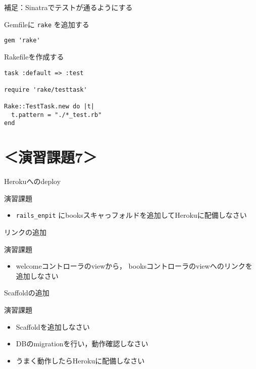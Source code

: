 \documentclass[t, aspectratio=169]{beamer}
\begin{document}
\begin{frame}[fragile,label=sec-7-3-9]{補足：Sinatraでテストが通るようにする}
 \begin{block}{Gemfileに \texttt{rake} を追加する}
\begin{verbatim}
gem 'rake'
\end{verbatim}
\end{block}
\begin{block}{Rakefileを作成する}
\begin{verbatim}
task :default => :test

require 'rake/testtask'

Rake::TestTask.new do |t|
  t.pattern = "./*_test.rb"
end
\end{verbatim}
\end{block}
\end{frame}
\section{＜演習課題7＞}
\label{sec-7-4}
\begin{frame}[fragile,label=sec-7-4-1]{Herokuへのdeploy}
 \begin{block}{演習課題}
\begin{itemize}
\item \texttt{rails\_enpit} にbooksスキャっフォルドを追加してHerokuに配備しなさい
\end{itemize}
\end{block}
\end{frame}

\begin{frame}[label=sec-7-4-2]{リンクの追加}
\begin{block}{演習課題}
\begin{itemize}
\item welcomeコントローラのviewから，
booksコントローラのviewへのリンクを追加しなさい
\end{itemize}
\end{block}
\end{frame}

\begin{frame}[label=sec-7-4-3]{Scaffoldの追加}
\begin{block}{演習課題}
\begin{itemize}
\item Scaffoldを追加しなさい
\item DBのmigrationを行い，動作確認しなさい
\item うまく動作したらHerokuに配備しなさい
\end{itemize}
\end{block}
\end{frame}
\end{document}
